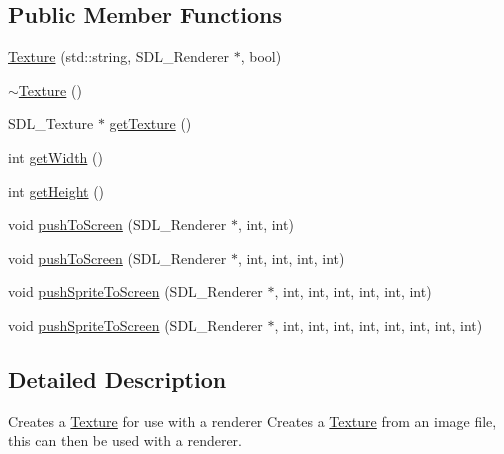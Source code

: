 \subsection*{Public Member Functions}
\begin{DoxyCompactItemize}
\item 
\hyperlink{class_texture_a6edf59e3b10e474356e8a7878af56b83}{Texture} (std\+::string, S\+D\+L\+\_\+\+Renderer $\ast$, bool)
\item 
\hyperlink{class_texture_a09c4bcb7462f64c1d20fa69dba3cee8a}{$\sim$\+Texture} ()
\item 
S\+D\+L\+\_\+\+Texture $\ast$ \hyperlink{class_texture_a77a1ae0043a4b318a60df3b02ef2d3f6}{get\+Texture} ()
\item 
int \hyperlink{class_texture_a91a6fd3355bc870194851514194daaab}{get\+Width} ()
\item 
int \hyperlink{class_texture_a80e143905655b173df5994300088ce35}{get\+Height} ()
\item 
void \hyperlink{class_texture_aec498f1f84eb10bb60d3c3117884e70f}{push\+To\+Screen} (S\+D\+L\+\_\+\+Renderer $\ast$, int, int)
\item 
void \hyperlink{class_texture_ab3b1f6aa29a50ef2c012fbc9d0cb8bd8}{push\+To\+Screen} (S\+D\+L\+\_\+\+Renderer $\ast$, int, int, int, int)
\item 
void \hyperlink{class_texture_a703db8963b46b751b8affce1807725b7}{push\+Sprite\+To\+Screen} (S\+D\+L\+\_\+\+Renderer $\ast$, int, int, int, int, int, int)
\item 
void \hyperlink{class_texture_a105a3aba66afb7d223ac086aa465b70d}{push\+Sprite\+To\+Screen} (S\+D\+L\+\_\+\+Renderer $\ast$, int, int, int, int, int, int, int, int)
\end{DoxyCompactItemize}


\subsection{Detailed Description}
Creates a \hyperlink{class_texture}{Texture} for use with a renderer Creates a \hyperlink{class_texture}{Texture} from an image file, this can then be used with a renderer. 

